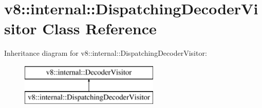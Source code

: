 \hypertarget{classv8_1_1internal_1_1_dispatching_decoder_visitor}{}\section{v8\+:\+:internal\+:\+:Dispatching\+Decoder\+Visitor Class Reference}
\label{classv8_1_1internal_1_1_dispatching_decoder_visitor}
Inheritance diagram for v8\+:\+:internal\+:\+:Dispatching\+Decoder\+Visitor\+:\begin{figure}[H]
\begin{center}
\leavevmode
\includegraphics[height=2.000000cm]{classv8_1_1internal_1_1_dispatching_decoder_visitor}
\end{center}
\end{figure}
